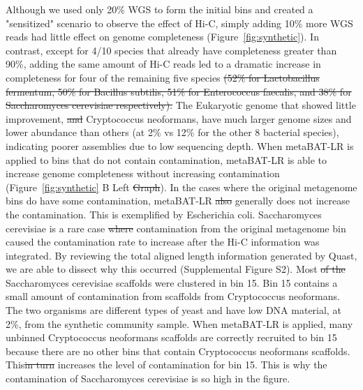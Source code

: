 \documentclass[fleqn,10pt,lineno]{wlpeerj}
\providecommand{\DIFaddtex}[1]{{\protect\color{blue}\uwave{#1}}} %
\providecommand{\DIFdeltex}[1]{{\protect\color{red}\sout{#1}}}                      %
\providecommand{\DIFaddbegin}{} %
\providecommand{\DIFaddend}{} %
\providecommand{\DIFdelbegin}{} %
\providecommand{\DIFdelend}{} %
\providecommand{\DIFadd}[1]{\texorpdfstring{\DIFaddtex{#1}}{#1}} %
\providecommand{\DIFdel}[1]{\texorpdfstring{\DIFdeltex{#1}}{}} %
\newcommand{\DIFscaledelfig}{0.5}
\newlength{\DIFdelgraphicswidth} %
\newlength{\DIFdelgraphicsheight} %
\newcommand{\DIFaddincludegraphics}[2][]{{\color{blue}\fbox{\DIFOincludegraphics[#1]{#2}}}} %
\newcommand{\DIFdelincludegraphics}[2][]{%
\sbox{\DIFdelgraphicsbox}{\DIFOincludegraphics[#1]{#2}}%
\settoboxwidth{\DIFdelgraphicswidth}{\DIFdelgraphicsbox} %
\settoboxtotalheight{\DIFdelgraphicsheight}{\DIFdelgraphicsbox} %
\scalebox{\DIFscaledelfig}{%
\parbox[b]{\DIFdelgraphicswidth}{\usebox{\DIFdelgraphicsbox}\\[-\baselineskip] \rule{\DIFdelgraphicswidth}{0em}}\llap{\resizebox{\DIFdelgraphicswidth}{\DIFdelgraphicsheight}{%
\setlength{\unitlength}{\DIFdelgraphicswidth}%
\begin{picture}(1,1)%
\thicklines\linethickness{2pt} %
{\color[rgb]{1,0,0}\put(0,0){\framebox(1,1){}}}%
{\color[rgb]{1,0,0}\put(0,0){\line( 1,1){1}}}%
{\color[rgb]{1,0,0}\put(0,1){\line(1,-1){1}}}%
\end{picture}%
}\hspace*{3pt}}} %
} %
\DeclareRobustCommand{\DIFaddbegin}{\DIFOaddbegin \let\includegraphics\DIFaddincludegraphics} %
\DeclareRobustCommand{\DIFaddend}{\DIFOaddend \let\includegraphics\DIFOincludegraphics} %
\DeclareRobustCommand{\DIFdelbegin}{\DIFOdelbegin \let\includegraphics\DIFdelincludegraphics} %
\DeclareRobustCommand{\DIFdelend}{\DIFOaddend \let\includegraphics\DIFOincludegraphics} %
\begin{document}
Although we used only 20\% WGS to form the initial bins and created a "sensitized" scenario to observe the effect of Hi-C, simply adding 10\% more WGS reads had little effect on genome completeness (Figure~\ref{fig:synthetic}). In contrast, except for 4/10 species that already have completeness greater than 90\%, adding the same amount of Hi-C reads led to a dramatic increase in \DIFaddbegin \DIFadd{percent genome }\DIFaddend completeness for four of the remaining five species \DIFdelbegin \DIFdel{(52\% for Lactobacillus fermentum, 50\% for Bacillus subtilis, 51\% for Enterococcus faecalis, and 38\% for Saccharomyces cerevisiae respectively). }\DIFdelend \DIFaddbegin {} \DIFaddend The Eukaryotic genome that showed little improvement, \DIFdelbegin \DIFdel{and }\DIFdelend \DIFaddbegin \DIFadd{such as }\DIFaddend Cryptococcus neoformans, have much larger genome sizes and lower abundance than others (at 2\% vs 12\% for the other 8 bacterial species), indicating poorer assemblies due to low sequencing depth. When metaBAT-LR is applied to bins that do not contain contamination, metaBAT-LR is able to increase genome completeness without increasing contamination (Figure~\ref{fig:synthetic} B Left \DIFdelbegin \DIFdel{Graph}\DIFdelend \DIFaddbegin \DIFadd{Set of Bar Plots}\DIFaddend ). In the cases where the original metagenome bins do have some contamination, metaBAT-LR \DIFdelbegin \DIFdel{also }\DIFdelend generally does not increase the contamination. This is exemplified by Escherichia coli. Saccharomyces cerevisiae is a rare case \DIFdelbegin \DIFdel{where }\DIFdelend \DIFaddbegin \DIFadd{in which }\DIFaddend contamination from the original metagenome bin caused the contamination rate to increase after the Hi-C information was integrated. By reviewing the total aligned length information generated by Quast, we are able to dissect why this occurred (Supplemental Figure S2). Most \DIFdelbegin \DIFdel{of the }\DIFdelend Saccharomyces cerevisiae scaffolds were clustered in bin 15. Bin 15 contains a small amount of contamination from scaffolds from Cryptococcus neoformans. The two organisms are different types of yeast and have low DNA material, at 2\%, from the synthetic community sample. When metaBAT-LR is applied, many unbinned Cryptococcus neoformans scaffolds are correctly recruited to bin 15 because there are no other bins that contain Cryptococcus neoformans scaffolds. This\DIFdelbegin \DIFdel{in turn }\DIFdelend \DIFaddbegin \DIFadd{, in turn, }\DIFaddend increases the level of contamination for bin 15. This is why the contamination of Saccharomyces cerevisiae is so high in the figure.\DIFaddbegin {}
\DIFaddend 
\end{document}
